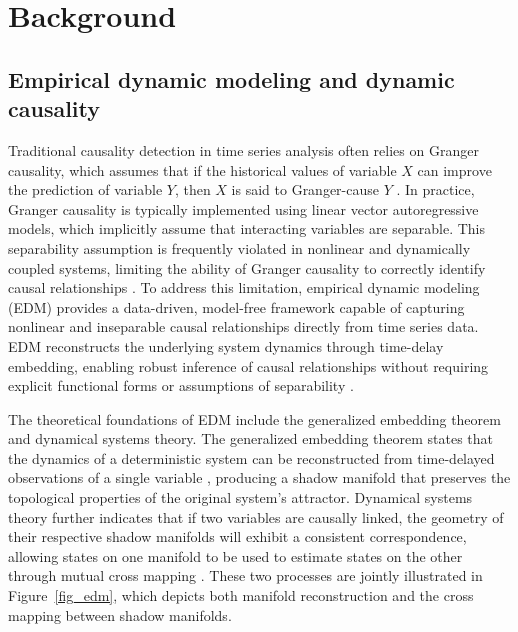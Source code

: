 \documentclass[authoryear,preprint,review,12pt]{elsarticle}
\begin{document}
\section{Background}\label{sec_bg}

\subsection{Empirical dynamic modeling and dynamic causality}\label{sec_edm}

Traditional causality detection in time series analysis often relies on Granger causality, which assumes that if the historical values of variable $X$ can improve the prediction of variable $Y$, then $X$ is said to Granger-cause $Y$ \citep{granger1969grangertest,geweke1982grangertest2}. In practice, Granger causality is typically implemented using linear vector autoregressive models, which implicitly assume that interacting variables are separable. This separability assumption is frequently violated in nonlinear and dynamically coupled systems, limiting the ability of Granger causality to correctly identify causal relationships \citep{sugihara2012ccm}. To address this limitation, empirical dynamic modeling (EDM) provides a data-driven, model-free framework capable of capturing nonlinear and inseparable causal relationships directly from time series data. EDM reconstructs the underlying system dynamics through time-delay embedding, enabling robust inference of causal relationships without requiring explicit functional forms or assumptions of separability \citep{Takens1981embedding,Mane1981embedding,sugihara2012ccm,leng2020pcm,tao2023cmc}.

The theoretical foundations of EDM include the generalized embedding theorem and dynamical systems theory. The generalized embedding theorem states that the dynamics of a deterministic system can be reconstructed from time-delayed observations of a single variable \citep{lorenz1969ssr,Takens1981embedding,Mane1981embedding}, producing a shadow manifold that preserves the topological properties of the original system's attractor. Dynamical systems theory further indicates that if two variables are causally linked, the geometry of their respective shadow manifolds will exhibit a consistent correspondence, allowing states on one manifold to be used to estimate states on the other through mutual cross mapping \citep{sugihara2012ccm,gao2023gccm}. These two processes are jointly illustrated in Figure~\ref{fig_edm}, which depicts both manifold reconstruction and the cross mapping between shadow manifolds.
\end{document}
